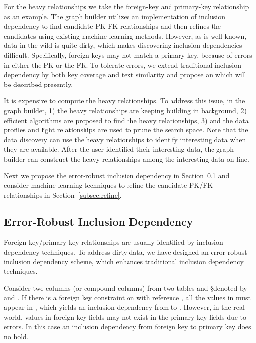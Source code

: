 For the heavy relationships we take the foreign-key and primary-key relationship as an example. The graph builder utilizes an implementation of inclusion dependency to find candidate PK-FK relationships and then refines the candidates using existing machine learning methods. However, as is well known, data in the wild is quite dirty, which makes discovering inclusion dependencies difficult. Specifically, foreign keys may not match a primary key, because of errors in either the PK or the FK. To tolerate errors, we extend traditional inclusion dependency by both key coverage and text similarity and propose an \emph{\eind} which will be described presently.


It is expensive to compute the heavy relationships. To address this issue, in the graph builder, 1) the heavy relationships are keeping building in background, 2) efficient algorithms are proposed to find the heavy relationships, 3) and the data profiles and light relationships are used to prune the search space. Note that the data discovery can use the heavy relationships to identify interesting data when they are available. After the user identified their interesting data, the graph builder can construct the heavy relationships among the interesting data on-line.


Next we propose the error-robust inclusion dependency in Section~\ref{subsec:eind} and consider machine learning techniques to refine the candidate PK/FK relationships in Section~\ref{subsec:refine}.


\subsection{Error-Robust Inclusion Dependency}\label{subsec:eind}

Foreign key/primary key relationships are usually identified by inclusion dependency techniques. To address dirty data, we have designed an error-robust inclusion dependency scheme, which enhances traditional inclusion dependency techniques.

Consider two columns (or compound columns) from two tables \R and \S denoted by \RX and \SY. If there is a foreign key constraint on \RX with reference \SY, all the values in \RX must appear in \SY, which yields an inclusion dependency from \RX to \SY. However, in the real world, values in foreign key fields may not exist in the primary key fields due to errors.  In this case an inclusion dependency from foreign key to primary key does no hold.


